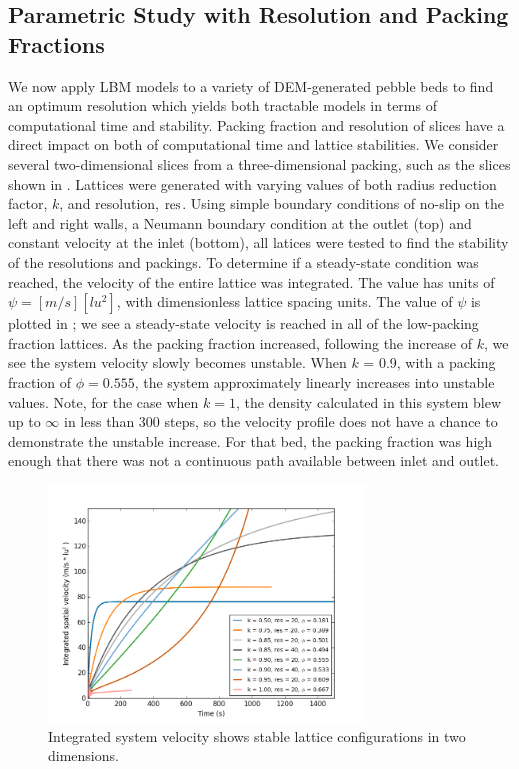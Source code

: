 \subsection{Parametric Study with Resolution and Packing Fractions}
We now apply LBM models to a variety of DEM-generated pebble beds to find an optimum resolution which yields both tractable models in terms of computational time and stability. Packing fraction and resolution of slices have a direct impact on both of computational time and lattice stabilities. We consider several two-dimensional slices from a three-dimensional packing, such as the slices shown in . Lattices were generated with varying values of both radius reduction factor, $k$, and resolution, $\text{res}$. Using simple boundary conditions of no-slip on the left and right walls, a Neumann boundary condition at the outlet (top) and constant velocity at the inlet (bottom), all latices were tested to find the stability of the resolutions and packings. To determine if a steady-state condition was reached, the velocity of the entire lattice was integrated. The value has units of $\psi = [m/s][lu^2]$, with dimensionless lattice spacing units. The value of $\psi$ is plotted in ; we see a steady-state velocity is reached in all of the low-packing fraction lattices. As the packing fraction increased, following the increase of $k$, we see the system velocity slowly becomes unstable. When $k$ = 0.9, with a packing fraction of $\phi = 0.555$, the system approximately linearly increases into unstable values. Note, for the case when $k=1$, the density calculated in this system blew up to $\infty$ in less than 300 steps, so the velocity profile does not have a chance to demonstrate the unstable increase. For that bed, the packing fraction was high enough that there was not a continuous path available between inlet and outlet.

\begin{figure}[ht]
    \centering
    \includegraphics[width=0.75\textwidth]{figures/lbm/2d-lbm-settings-velocity}
    \caption{Integrated system velocity shows stable lattice configurations in two dimensions.}\label{fig:2d-lbm-settings-velocity}
\end{figure}


